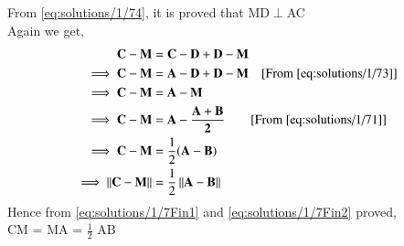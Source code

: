 From \eqref{eq:solutions/1/74}, it is proved that MD$\perp$AC\\
Again we get,
\begin{align}
\mathbf{C-M} &= \mathbf{C - D}+\mathbf{D - M}\\
\implies\mathbf{C-M} &= \mathbf{A - D}+\mathbf{D - M}\quad\text{[From \eqref{eq:solutions/1/73}]}\\
\implies\mathbf{C - M} &= \mathbf{A - M}\label{eq:solutions/1/7Fin1}\\
\implies\mathbf{C - M} &= \mathbf{A} - \mathbf{\frac{\mathbf{A}+\mathbf{B}}{2}}\qquad\text{[From \eqref{eq:solutions/1/71}]}\\
\implies\mathbf{C - M} &= \frac{1}{2}(\mathbf{A-B})\\
\implies\left\lVert\mathbf{C - M}\right\rVert &= \frac{1}{2}\left\lVert\mathbf{A-B}\right\rVert\label{eq:solutions/1/7Fin2}
\end{align}
Hence from \eqref{eq:solutions/1/7Fin1} and \eqref{eq:solutions/1/7Fin2} proved,\\CM = MA = $\frac{1}{2}$ AB

